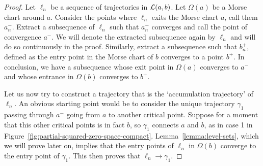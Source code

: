 \begin{proof}
    Let $ \ell_n$ be a sequence of trajectories in $\mathcal L(a, b)$.
    Let $\Omega(a)$ be a Morse chart around $a$.
    Consider the points where $\ell_n$ exits the Morse chart $a$, call them $a_n^{-}$.
    Extract a subsequence of $\ell_n$ such that $a_{n}^{-}$ converges and call the point of convergence $a^{-}$.
    We will denote the extracted subsequence again by $\ell_n$ and will do so continuously in the proof.
    Similarly, extract a subsequence such that $b_n^{+}$, defined as the entry point in the Morse chart of $b$ converges to a point $b^{+}$.
    In conclusion, we have a subsequence whose exit point in $\Omega(a)$  converges to $a^{-}$ and whose entrance in $\Omega(b)$ converges to  $b^{+}$.

    Let us now try to construct a trajectory that is the `accumulation trajectory' of $\ell_n$.
    An obvious starting point would be to consider the unique trajectory $\gamma_1$ passing through $a^{-}$ going from $a$ to another critical point.
    Suppose for a moment that this other critical points is in fact $b$, so $\gamma_1$ connects  $a$ and  $b$, as in case 1 in Figure~\ref{fig:partial-squared-zero-space-compact}.
    Lemma~\ref{lemma:level-sets}, which we will prove later on, implies that the entry points of $\ell_n$ in $\Omega(b)$ converge to the entry point of $\gamma_1$. This then proves that $\ell_n \to  \gamma_1$.


\end{proof}
